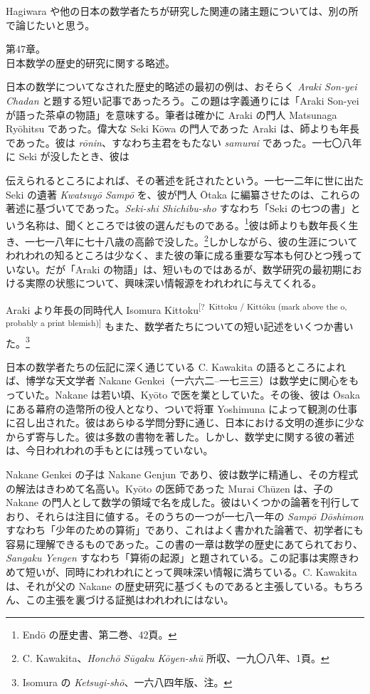 \documentclass[11pt]{article}
\newcommand{\scanpage}[2]{\clearpage\setcounter{footnote}{0}\noindent{\footnotesize\color{gray}PDF #1 頁 · #2}\par\medskip}
\newcommand{\unclear}[1]{\textsuperscript{[?~#1]}}
\begin{document}
Hagiwara や他の日本の数学者たちが研究した関連の諸主題については、別の所で論じたいと思う。

\begin{center}
第47章。\\[1mm]
日本数学の歴史的研究に関する略述。
\end{center}

日本の数学についてなされた歴史的略述の最初の例は、おそらく \emph{Araki Son-yei Chadan} と題する短い記事であったろう。この題は字義通りには「Araki Son-yei が語った茶卓の物語」を意味する。筆者は確かに Araki の門人 Matsunaga Ryōhitsu であった。偉大な Seki Kōwa の門人であった Araki は、師よりも年長であった。彼は \emph{rōnin}、すなわち主君をもたない \emph{samurai} であった。一七〇八年に Seki が没したとき、彼は

\scanpage{0337}{印刷頁 323}
\noindent 伝えられるところによれば、その著述を託されたという。一七一二年に世に出た Seki の遺著 \emph{Kwatsuyō Sampō} を、彼が門人 Ōtaka に編纂させたのは、これらの著述に基づいてであった。\emph{Seki-shi Shichibu-sho} すなわち「Seki の七つの書」という名称は、聞くところでは彼の選んだものである。\footnote{Endō の歴史書、第二巻、42頁。}彼は師よりも数年長く生き、一七一八年に七十八歳の高齢で没した。\footnote{C. Kawakita、\emph{Honchō Sūgaku Kōyen-shū} 所収、一九〇八年、1頁。}しかしながら、彼の生涯についてわれわれの知るところは少なく、また彼の筆に成る重要な写本も何ひとつ残っていない。だが「Araki の物語」は、短いものではあるが、数学研究の最初期における実際の状態について、興味深い情報源をわれわれに与えてくれる。

Araki より年長の同時代人 Isomura Kittoku\unclear{Kittoku / Kittóku (mark above the o, probably a print blemish)} もまた、数学者たちについての短い記述をいくつか書いた。\footnote{Isomura の \emph{Ketsugi-shō}、一六八四年版、注。}

日本の数学者たちの伝記に深く通じている C. Kawakita の語るところによれば、博学な天文学者 Nakane Genkei（一六六二--一七三三）は数学史に関心をもっていた。Nakane は若い頃、Kyōto で医を業としていた。その後、彼は Ōsaka にある幕府の造幣所の役人となり、ついで将軍 Yoshimuna によって観測の仕事に召し出された。彼はあらゆる学問分野に通じ、日本における文明の進歩に少なからず寄与した。彼は多数の書物を著した。しかし、数学史に関する彼の著述は、今日われわれの手もとには残っていない。

Nakane Genkei の子は Nakane Genjun であり、彼は数学に精通し、その方程式の解法はきわめて名高い。Kyōto の医師であった Murai Chūzen は、子の Nakane の門人として数学の領域で名を成した。彼はいくつかの論著を刊行しており、それらは注目に値する。そのうちの一つが一七八一年の \emph{Sampō Dōshimon} すなわち「少年のための算術」であり、これはよく書かれた論著で、初学者にも容易に理解できるものであった。この書の一章は数学の歴史にあてられており、\emph{Sangaku Yengen} すなわち「算術の起源」と題されている。この記事は実際きわめて短いが、同時にわれわれにとって興味深い情報に満ちている。C. Kawakita は、それが父の Nakane の歴史研究に基づくものであると主張している。もちろん、この主張を裏づける証拠はわれわれにはない。
\end{document}
